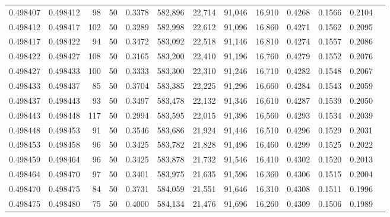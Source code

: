 \begin{tabular}{rrrrrrrrrrrrr}
0.498407 & 0.498412 &    98 &  50 &                                     0.3378 & 582,896 &  22,714 &  91,046 &  16,910 & 0.4268 & 0.1566 & 0.2104 \\
0.498412 & 0.498417 &   102 &  50 &                                     0.3289 & 582,998 &  22,612 &  91,096 &  16,860 & 0.4271 & 0.1562 & 0.2095 \\
0.498417 & 0.498422 &    94 &  50 &                                     0.3472 & 583,092 &  22,518 &  91,146 &  16,810 & 0.4274 & 0.1557 & 0.2086 \\
0.498422 & 0.498427 &   108 &  50 &                                     0.3165 & 583,200 &  22,410 &  91,196 &  16,760 & 0.4279 & 0.1552 & 0.2076 \\
0.498427 & 0.498433 &   100 &  50 &                                     0.3333 & 583,300 &  22,310 &  91,246 &  16,710 & 0.4282 & 0.1548 & 0.2067 \\
0.498433 & 0.498437 &    85 &  50 &                                     0.3704 & 583,385 &  22,225 &  91,296 &  16,660 & 0.4284 & 0.1543 & 0.2059 \\
0.498437 & 0.498443 &    93 &  50 &                                     0.3497 & 583,478 &  22,132 &  91,346 &  16,610 & 0.4287 & 0.1539 & 0.2050 \\
0.498443 & 0.498448 &   117 &  50 &                                     0.2994 & 583,595 &  22,015 &  91,396 &  16,560 & 0.4293 & 0.1534 & 0.2039 \\
0.498448 & 0.498453 &    91 &  50 &                                     0.3546 & 583,686 &  21,924 &  91,446 &  16,510 & 0.4296 & 0.1529 & 0.2031 \\
0.498453 & 0.498458 &    96 &  50 &                                     0.3425 & 583,782 &  21,828 &  91,496 &  16,460 & 0.4299 & 0.1525 & 0.2022 \\
0.498459 & 0.498464 &    96 &  50 &                                     0.3425 & 583,878 &  21,732 &  91,546 &  16,410 & 0.4302 & 0.1520 & 0.2013 \\
0.498464 & 0.498470 &    97 &  50 &                                     0.3401 & 583,975 &  21,635 &  91,596 &  16,360 & 0.4306 & 0.1515 & 0.2004 \\
0.498470 & 0.498475 &    84 &  50 &                                     0.3731 & 584,059 &  21,551 &  91,646 &  16,310 & 0.4308 & 0.1511 & 0.1996 \\
0.498475 & 0.498480 &    75 &  50 &                                     0.4000 & 584,134 &  21,476 &  91,696 &  16,260 & 0.4309 & 0.1506 & 0.1989 \\

\end{tabular}

